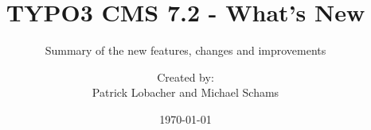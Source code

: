 %
%
%

\documentclass[t]{beamer}

\beamertemplatenavigationsymbolsempty

{
	\usetheme{typo3slides}
}

\title{TYPO3 CMS 7.2 - What's New}
\subtitle{Summary of the new features, changes and improvements}
\author{
	\centerline{Created by:}
	\centerline{Patrick Lobacher and Michael Schams}
}

\date{\today}



\sharefont


\begingroup
	[default]
	\begin{frame}
		\titlepage
	\end{frame}
\endgroup


\section*{TYPO3 CMS 7.2 - What's New}
\begin{frame}[fragile]
	\frametitle{Chapter Overview}
	\framesubtitle{Chapter Overview}

	\begin{multicols}{2}
		\tableofcontents
	\end{multicols}

\end{frame}

